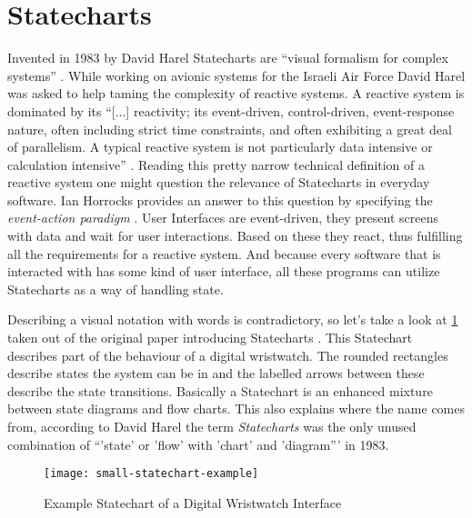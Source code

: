 \section{Statecharts}
\label{sec:statecharts}
Invented in 1983 by David Harel Statecharts are ``visual formalism for complex systems'' \autocite{harel_statecharts:_1987}.
While working on avionic systems for the Israeli Air Force David Harel was asked to help taming the complexity of reactive systems.
A reactive system is dominated by its ``[...] reactivity; its event-driven, control-driven, event-response nature, often including strict time constraints, and often exhibiting a great deal of parallelism. A typical reactive system is not particularly data intensive or calculation intensive'' \autocite{harel_statecharts_2007}.
Reading this pretty narrow technical definition of a reactive system one might question the relevance of Statecharts in everyday software.
Ian Horrocks provides an answer to this question by specifying the \emph{event-action paradigm} \autocite{horrocks_constructing_1999}.
User Interfaces are event-driven, they present screens with data and wait for user interactions.
Based on these they react, thus fulfilling all the requirements for a reactive system.
And because every software that is interacted with has some kind of user interface, all these programs can utilize Statecharts as a way of handling state.

Describing a visual notation with words is contradictory, so let's take a look at \cref{fig:statecharts-example} taken out of the original paper introducing Statecharts \autocite{harel_statecharts:_1987}.
This Statechart describes part of the behaviour of a digital wristwatch.
The rounded rectangles describe states the system can be in and the labelled arrows between these describe the state transitions.
Basically a Statechart is an enhanced mixture between state diagrams and flow charts.
This also explains where the name comes from, according to David Harel the term \emph{Statecharts} was the only unused combination of ``'state' or 'flow' with 'chart' and 'diagram''' in 1983.

\begin{figure}[h]
\centering
\texttt{[image: small-statechart-example]}
\caption{Example Statechart of a Digital Wristwatch Interface}
\label{fig:statecharts-example}
\end{figure}

